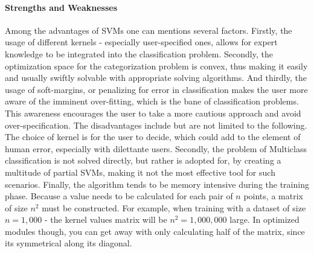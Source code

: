 \paragraph{Strengths and Weaknesses}
	Among the advantages of SVMs one can mentions several factors. Firstly, the usage of different kernels - especially user-specified ones, allows for expert knowledge to be integrated into the classification problem. Secondly, the optimization space for the categorization problem is convex, thus making it easily and usually swiftly solvable with appropriate solving algorithms. And thirdly, the usage of soft-margins, or penalizing for error in classification makes the user more aware of the imminent over-fitting, which is the bane of classification problems. This awareness encourages the user to take a more cautious approach and avoid over-specification. The disadvantages include but are not limited to the following. The choice of kernel is for the user to decide, which could add to the element of human error, especially with dilettante users. Secondly, the problem of Multiclass classification is not solved directly, but rather is adopted for, by creating a multitude of partial SVMs, making it not the most effective tool for such scenarios. Finally, the algorithm tends to be memory intensive during the training phase. Because a value needs to be calculated for each pair of $n$ points, a matrix of size $n^2$ must be constructed. For example, when training with a dataset of size $n = 1,000$ - the kernel values matrix will be $n^2 = 1,000,000$ large. In optimized modules though, you can get away with only calculating half of the matrix, since its symmetrical along its diagonal.

